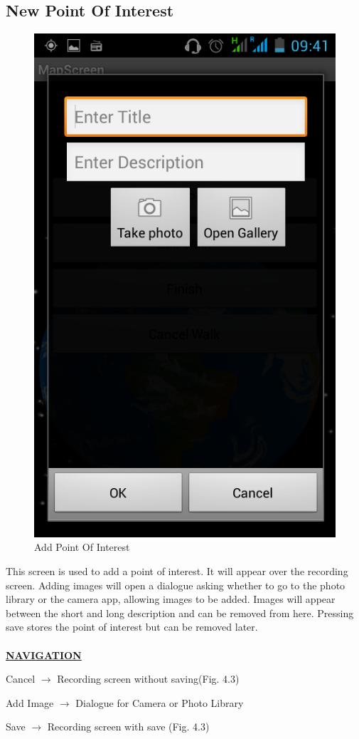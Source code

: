 \documentclass[12pt]{article}
\begin{document}
\subsection{New Point Of Interest}
\begin{figure}[htp]
\centering
\includegraphics[scale=0.4]{Project_Plan/android/add_poi.png}
\caption{Add Point Of Interest}
\label{Add Point Of Interest}
\end{figure}
\par{This screen is used to add a point of interest. It will appear over the recording screen. Adding images will open a dialogue asking whether to go to the photo library or the camera app, allowing images to be added. Images will appear between the short and long description and can be removed from here. Pressing save stores the point of interest but can be removed later. \\ \\}
\textbf{\uline{NAVIGATION}}
\par{Cancel $\rightarrow$ Recording screen without saving(Fig. 4.3)}
\par{Add Image $\rightarrow$ Dialogue for Camera or Photo Library}
\par{Save $\rightarrow$ Recording screen with save (Fig. 4.3)}
\newpage
\end{document}
